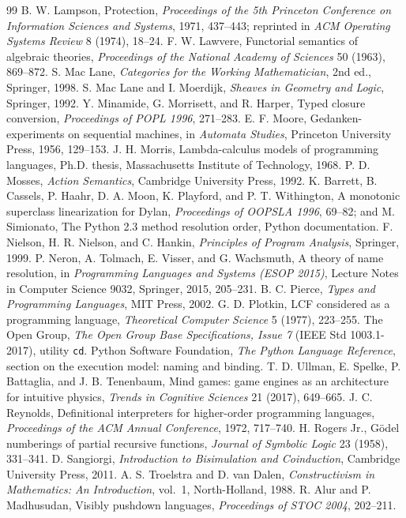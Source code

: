 \documentclass[11pt]{article}
\theoremstyle{definition}
\theoremstyle{remark}
\begin{document}
\begin{thebibliography}{99}
 B. W. Lampson, Protection, \emph{Proceedings of the 5th Princeton Conference on Information Sciences and Systems}, 1971, 437--443; reprinted in \emph{ACM Operating Systems Review} 8 (1974), 18--24.
 F. W. Lawvere, Functorial semantics of algebraic theories, \emph{Proceedings of the National Academy of Sciences} 50 (1963), 869--872.
 S. Mac Lane, \emph{Categories for the Working Mathematician}, 2nd ed., Springer, 1998.
 S. Mac Lane and I. Moerdijk, \emph{Sheaves in Geometry and Logic}, Springer, 1992.
 Y. Minamide, G. Morrisett, and R. Harper, Typed closure conversion, \emph{Proceedings of POPL 1996}, 271--283.
 E. F. Moore, Gedanken-experiments on sequential machines, in \emph{Automata Studies}, Princeton University Press, 1956, 129--153.
 J. H. Morris, Lambda-calculus models of programming languages, Ph.D. thesis, Massachusetts Institute of Technology, 1968.
 P. D. Mosses, \emph{Action Semantics}, Cambridge University Press, 1992.
 K. Barrett, B. Cassels, P. Haahr, D. A. Moon, K. Playford, and P. T. Withington, A monotonic superclass linearization for Dylan, \emph{Proceedings of OOPSLA 1996}, 69--82; and M. Simionato, The Python 2.3 method resolution order, Python documentation.
 F. Nielson, H. R. Nielson, and C. Hankin, \emph{Principles of Program Analysis}, Springer, 1999.
 P. Neron, A. Tolmach, E. Visser, and G. Wachsmuth, A theory of name resolution, in \emph{Programming Languages and Systems (ESOP 2015)}, Lecture Notes in Computer Science 9032, Springer, 2015, 205--231.
 B. C. Pierce, \emph{Types and Programming Languages}, MIT Press, 2002.
 G. D. Plotkin, LCF considered as a programming language, \emph{Theoretical Computer Science} 5 (1977), 223--255.
 The Open Group, \emph{The Open Group Base Specifications, Issue 7} (IEEE Std 1003.1-2017), utility \texttt{cd}.
 Python Software Foundation, \emph{The Python Language Reference}, section on the execution model: naming and binding.
 T. D. Ullman, E. Spelke, P. Battaglia, and J. B. Tenenbaum, Mind games: game engines as an architecture for intuitive physics, \emph{Trends in Cognitive Sciences} 21 (2017), 649--665.
 J. C. Reynolds, Definitional interpreters for higher-order programming languages, \emph{Proceedings of the ACM Annual Conference}, 1972, 717--740.
 H. Rogers Jr., G\"odel numberings of partial recursive functions, \emph{Journal of Symbolic Logic} 23 (1958), 331--341.
 D. Sangiorgi, \emph{Introduction to Bisimulation and Coinduction}, Cambridge University Press, 2011.
 A. S. Troelstra and D. van Dalen, \emph{Constructivism in Mathematics: An Introduction}, vol.~1, North-Holland, 1988.
 R. Alur and P. Madhusudan, Visibly pushdown languages, \emph{Proceedings of STOC 2004}, 202--211.
\end{thebibliography}
\end{document}
